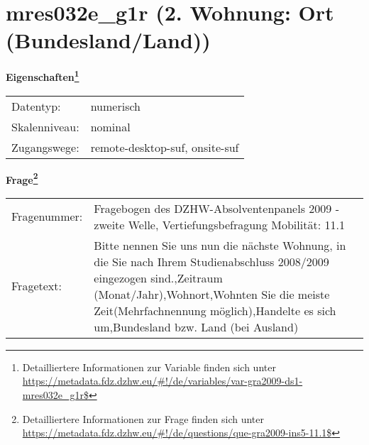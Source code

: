 
    \setcounter{footnote}{0}

    \vspace*{-1.8cm}
	\section{mres032e\_g1r (2. Wohnung: Ort (Bundesland/Land))}
	\label{section:mres032e_g1r}



    \vspace*{0.5cm}
    \noindent\textbf{Eigenschaften\footnote{Detailliertere Informationen zur Variable finden sich unter
		\url{https://metadata.fdz.dzhw.eu/\#!/de/variables/var-gra2009-ds1-mres032e_g1r$}}}\\
	\begin{tabularx}{\hsize}{@{}lX}
	Datentyp: & numerisch \\
	Skalenniveau: & nominal \\
	Zugangswege: &
	  remote-desktop-suf, 
	  onsite-suf
 \\
    \end{tabularx}



				\vspace*{0.5cm}
                \noindent\textbf{Frage\footnote{Detailliertere Informationen zur Frage finden sich unter
		              \url{https://metadata.fdz.dzhw.eu/\#!/de/questions/que-gra2009-ins5-11.1$}}}\\
				\begin{tabularx}{\hsize}{@{}lX}
					Fragenummer: &
					  Fragebogen des DZHW-Absolventenpanels 2009 - zweite Welle, Vertiefungsbefragung Mobilität:
					  11.1
 \\
					Fragetext: & Bitte nennen Sie uns nun die nächste Wohnung, in die Sie nach Ihrem Studienabschluss 2008/2009 eingezogen sind.,Zeitraum (Monat/Jahr),Wohnort,Wohnten Sie die meiste Zeit(Mehrfachnennung möglich),Handelte es sich um,Bundesland bzw. Land (bei Ausland) \\
				\end{tabularx}





